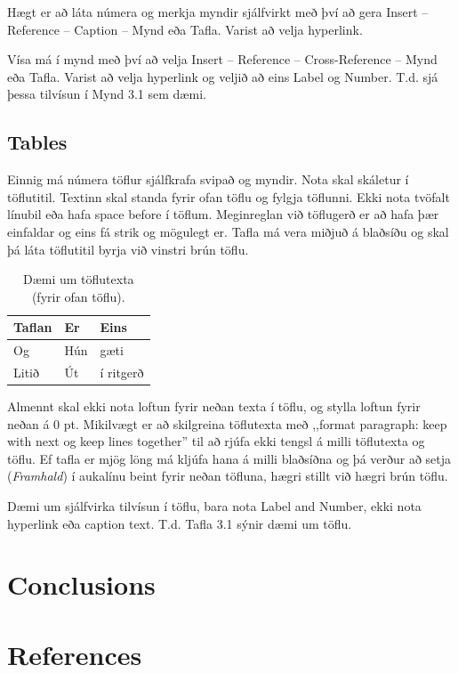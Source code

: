 \documentclass[a4paper,12pt,twoside,BCOR=10mm]{scrbook}
\begin{document}
Hægt er að láta númera og merkja myndir sjálfvirkt með því að gera Insert – Reference – Caption – Mynd eða Tafla. Varist að velja hyperlink. 

Vísa má í mynd með því að velja Insert – Reference – Cross-Reference – Mynd eða Tafla. Varist að velja hyperlink og veljið að eins Label og Number. T.d. sjá þessa tilvísun í Mynd 3.1 sem dæmi. 

\section{Tables}
Einnig má númera töflur sjálfkrafa svipað og myndir. Nota skal skáletur í töflutitil. Textinn skal standa fyrir ofan töflu og fylgja töflunni.  Ekki nota tvöfalt línubil eða hafa space before í töflum. Meginreglan við töflugerð er að hafa þær einfaldar og eins fá strik og mögulegt er. Tafla má vera miðjuð á blaðsíðu og skal þá láta töflutitil byrja við vinstri brún töflu.


\begin{table}[htb]
\centering
\caption{Dæmi um töflutexta (fyrir ofan töflu).}
     \sffamily \begin{tabularx}{1.0\textwidth}{ p{5cm}  p{5cm}  p{5cm} }
    \hline
   \textbf{Taflan} \hfill & \textbf{Er} \hfill & \textbf{Eins} \\ \hline
    Og & Hún & gæti\\
    Litið & Út & í ritgerð\\ \hline
    \end{tabularx} \normalfont
\label{table:Emissivity}
\end{table}

Almennt skal ekki nota loftun fyrir neðan texta í töflu, og stylla loftun fyrir neðan á 0 pt.
Mikilvægt er að skilgreina töflutexta með ,,format paragraph: keep with next og keep lines together” til að rjúfa ekki tengsl á milli töflutexta og töflu. Ef tafla er mjög löng má kljúfa hana á milli blaðsíðna og þá verður að setja (\textit{Framhald}) í aukalínu beint fyrir neðan töfluna, hægri stillt við hægri brún töflu.

Dæmi um sjálfvirka tilvísun í töflu, bara nota Label and Number, ekki nota hyperlink eða caption text. T.d. Tafla 3.1 sýnir dæmi um töflu.

\chapter{Conclusions}

\chapter{References}
\end{document}

